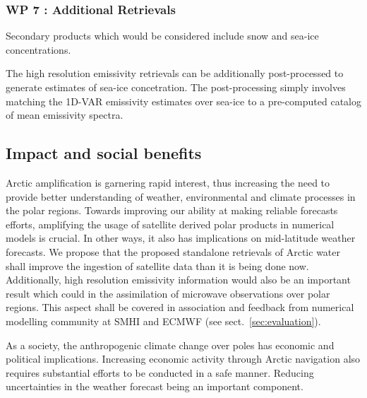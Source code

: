 \documentclass[12pt,oneside,a4paper]{article}
\begin{document}
\subsubsection*{WP 7 : Additional Retrievals}
%
\label{sec:other_retrievals}

Secondary products which would be considered include snow and sea-ice concentrations.  


The high resolution emissivity retrievals can be additionally post-processed to generate estimates of sea-ice concetration. The post-processing simply involves matching the 1D-VAR emissivity estimates over sea-ice to a pre-computed catalog of mean emissivity spectra. 


\subsection{Impact and social benefits}
%
\label{sec:impact}
Arctic amplification is garnering rapid interest, thus increasing the need to provide better understanding of weather, environmental and climate processes in the polar regions. Towards improving our ability at making reliable forecasts efforts, amplifying the usage of satellite derived polar products in numerical models is crucial. In other ways, it also has implications on mid-latitude weather forecasts. We propose that the proposed standalone retrievals of Arctic water shall improve the ingestion of satellite data than it is being done now. Additionally, high resolution emissivity information would also be an important result which could in the assimilation of microwave observations over polar regions. This aspect shall be covered in association and feedback from numerical modelling community at SMHI and ECMWF (see sect.~\ref{sec:evaluation}).

As a society, the anthropogenic climate change over poles has economic and political implications. Increasing economic activity through Arctic navigation also requires substantial efforts to be conducted in a safe manner. Reducing uncertainties in the weather forecast being an important component. 

 
\end{document}
